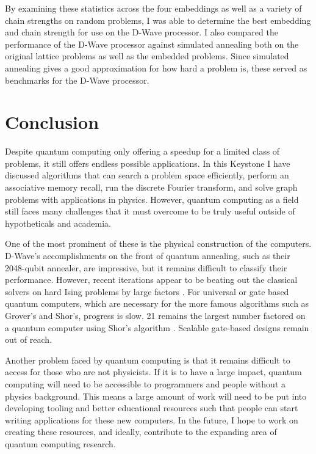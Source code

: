 \documentclass[11pt]{report}
\newcommand{\?}{\stackrel{?}{=}}
\begin{document}
By examining these statistics across the four embeddings as well as a variety of chain strengths on random problems, I was able to determine the best embedding and chain strength for use on the D-Wave processor. I also compared the performance of the D-Wave processor against simulated annealing both on the original lattice problems as well as the embedded problems. Since simulated annealing gives a good approximation for how hard a problem is, these served as benchmarks for the D-Wave processor.

\chapter{Conclusion}

Despite quantum computing only offering a speedup for a limited class of problems, it still offers endless possible applications. In this Keystone I have discussed algorithms that can search a problem space efficiently, perform an associative memory recall, run the discrete Fourier transform, and solve graph problems with applications in physics. However, quantum computing as a field still faces many challenges that it must overcome to be truly useful outside of hypotheticals and academia.

One of the most prominent of these is the physical construction of the computers. D-Wave's accomplishments on the front of quantum annealing, such as their 2048-qubit annealer, are impressive, but it remains difficult to classify their performance. However, recent iterations appear to be beating out the classical solvers on hard Ising problems by large factors \cite{googleblog}. For universal or gate based quantum computers, which are necessary for the more famous algorithms such as Grover's and Shor's, progress is slow. 21 remains the largest number factored on a quantum computer using Shor's algorithm \cite{martinlopez}. Scalable gate-based designs remain out of reach.

Another problem faced by quantum computing is that it remains difficult to access for those who are not physicists. If it is to have a large impact, quantum computing will need to be accessible to programmers and people without a physics background. This means a large amount of work will need to be put into developing tooling and better educational resources such that people can start writing applications for these new computers. In the future, I hope to work on creating these resources, and ideally, contribute to the expanding area of quantum computing research. 
\end{document}
